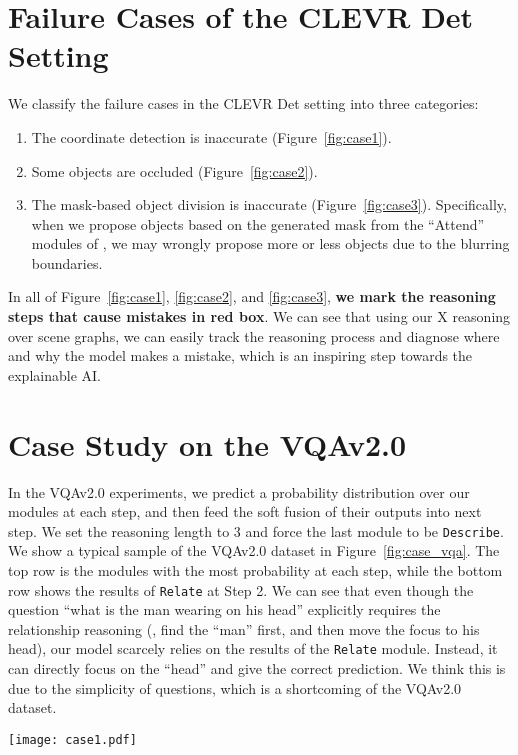 \documentclass[10pt,twocolumn,letterpaper]{article}
\begin{document}
\section{Failure Cases of the CLEVR Det Setting}
We classify the failure cases in the CLEVR Det setting into three categories:
\begin{enumerate}
    \item The coordinate detection is inaccurate (Figure~\ref{fig:case1}).
    \item Some objects are occluded (Figure~\ref{fig:case2}).
    \item The mask-based object division is inaccurate (Figure~\ref{fig:case3}). Specifically, when we propose objects based on the generated mask from the ``Attend'' modules of \cite{mascharka2018transparency}, we may wrongly propose more or less objects due to the blurring boundaries.
\end{enumerate}
In all of Figure~\ref{fig:case1}, \ref{fig:case2}, and \ref{fig:case3}, \textbf{we mark the reasoning steps that cause mistakes in red box}.
We can see that using our X reasoning over scene graphs, we can easily track the reasoning process and diagnose where and why the model makes a mistake, which is an inspiring step towards the explainable AI.



\section{Case Study on the VQAv2.0}
In the VQAv2.0 experiments, we predict a probability distribution over our modules at each step, and then feed the soft fusion of their outputs into next step.
We set the reasoning length to $3$ and force the last module to be \texttt{Describe}.
We show a typical sample of the VQAv2.0 dataset in Figure~\ref{fig:case_vqa}.
The top row is the modules with the most probability at each step, while the bottom row shows the results of \texttt{Relate} at Step 2.
We can see that even though the question ``what is the man wearing on his head'' explicitly requires the relationship reasoning (\ie, find the ``man'' first, and then move the focus to his head), our model scarcely relies on the results of the \texttt{Relate} module.
Instead, it can directly focus on the ``head'' and give the correct prediction.
We think this is due to the simplicity of questions, which is a shortcoming of the VQAv2.0 dataset.




\begin{figure*}[ht]
    \centering
    \texttt{[image: case1.pdf]}
    \caption{Failure cases caused by the inaccurate coordinate detection. Top case: the large brown cube is not behind the gray rubber object. Bottom case: a large red cube is wrongly recognized to be behind the tiny cylinder.}
    \label{fig:case1}
\end{figure*}
\end{document}
